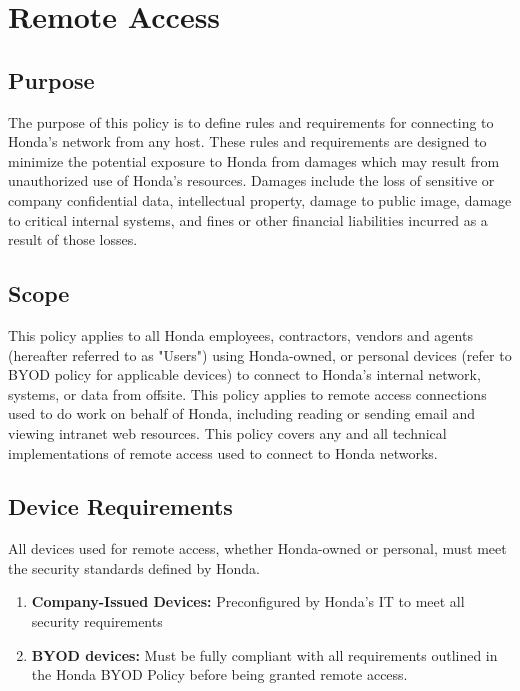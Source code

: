 \chapter{Remote Access}
\pagestyle{fancy}

\fancyhf{}

\fancyfoot[C]{\thepage}

\renewcommand{\headrulewidth}{0pt}
\renewcommand{\footrulewidth}{0pt}

\section{Purpose}
The purpose of this policy is to define rules and requirements for connecting to Honda's network from any host. These rules and requirements are designed to minimize the potential exposure to Honda from damages which may result from unauthorized use of Honda's resources. Damages include the loss of sensitive or company confidential data, intellectual property, damage to public image, damage to critical internal systems, and fines or other financial liabilities incurred as a result of those losses.

\section{Scope}
This policy applies to all Honda employees, contractors, vendors and agents (hereafter referred to as "Users") using Honda-owned, or personal devices (refer to BYOD policy for applicable devices) to connect to Honda's internal network, systems, or data from offsite. This policy applies to remote access connections used to do work on behalf of Honda, including reading or sending email and viewing intranet web resources. This policy covers any and all technical implementations of remote access used to connect to Honda networks.

\section{Device Requirements}
All devices used for remote access, whether Honda-owned or personal, must meet the security standards defined by Honda.
\begin{enumerate}
    \item \textbf{Company-Issued Devices:} Preconfigured by Honda's IT to meet all security requirements
    \item \textbf{BYOD devices:} Must be fully compliant with all requirements outlined in the Honda BYOD Policy before being granted remote access.
\end{enumerate}
    
